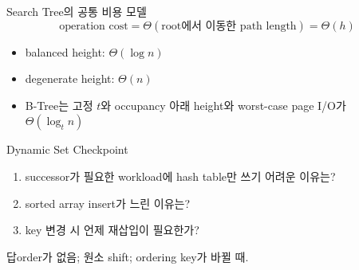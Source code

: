 \begin{frame}{Search Tree의 공통 비용 모델}
\[
\text{operation cost}=\Theta(\text{root에서 이동한 path length})=\Theta(h)
\]
\begin{itemize}\item balanced height: $\Theta(\log n)$\item degenerate height: $\Theta(n)$\item B-Tree는 고정 $t$와 occupancy 아래 height와 worst-case page I/O가 $\Theta(\log_t n)$\end{itemize}
\end{frame}
\begin{frame}{Dynamic Set Checkpoint}
\begin{enumerate}\item successor가 필요한 workload에 hash table만 쓰기 어려운 이유는?\item sorted array insert가 느린 이유는?\item key 변경 시 언제 재삽입이 필요한가?\end{enumerate}
\begin{exampleblock}{답}order가 없음; 원소 shift; ordering key가 바뀔 때.\end{exampleblock}
\end{frame}
